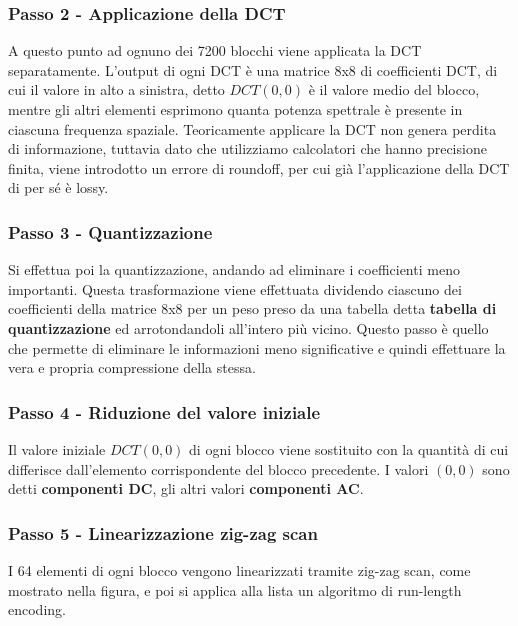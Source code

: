 \begin{figure}[htbp!]
  \centering
  
\end{figure}
\FloatBarrier

\subsubsection{Passo 2 - Applicazione della DCT}
A questo punto ad ognuno dei 7200 blocchi viene applicata la DCT separatamente. L'output di ogni DCT è una matrice 8x8 di coefficienti DCT, di cui il valore in alto a sinistra, detto \(DCT(0,0)\) è il valore medio del blocco, mentre gli altri elementi esprimono quanta potenza spettrale è presente in ciascuna frequenza spaziale. Teoricamente applicare la DCT non genera perdita di informazione, tuttavia dato che utilizziamo calcolatori che hanno precisione finita, viene introdotto un errore di roundoff, per cui già l'applicazione della DCT di per sé è lossy.

\subsubsection{Passo 3 - Quantizzazione}
Si effettua poi la quantizzazione, andando ad eliminare i coefficienti meno importanti. Questa trasformazione viene effettuata dividendo ciascuno dei coefficienti della matrice 8x8 per un peso preso da una tabella detta \textbf{tabella di quantizzazione} ed arrotondandoli all'intero più vicino. Questo passo è quello che permette di eliminare le informazioni meno significative e quindi effettuare la vera e propria compressione della stessa.

\subsubsection{Passo 4 - Riduzione del valore iniziale}
Il valore iniziale \(DCT(0,0)\) di ogni blocco viene sostituito con la quantità di cui differisce dall'elemento corrispondente del blocco precedente. I valori \((0,0)\) sono detti \textbf{componenti DC}, gli altri valori \textbf{componenti AC}.

\subsubsection{Passo 5 - Linearizzazione zig-zag scan}
I 64 elementi di ogni blocco vengono linearizzati tramite zig-zag scan, come mostrato nella figura, e poi si applica alla lista un algoritmo di run-length encoding.

